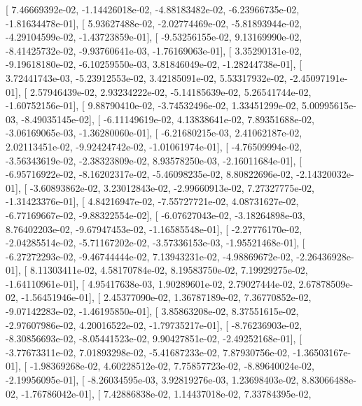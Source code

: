 \documentclass{article}
\begin{document}
       [  7.46669392e-02,  -1.14426018e-02,  -4.88183482e-02,
         -6.23966735e-02,  -1.81634478e-01],
       [  5.93627488e-02,  -2.02774469e-02,  -5.81893944e-02,
         -4.29104599e-02,  -1.43723859e-01],
       [ -9.53256155e-02,   9.13169990e-02,  -8.41425732e-02,
         -9.93760641e-03,  -1.76169063e-01],
       [  3.35290131e-02,  -9.19618180e-02,  -6.10259550e-03,
          3.81846049e-02,  -1.28244738e-01],
       [  3.72441743e-03,  -5.23912553e-02,   3.42185091e-02,
          5.53317932e-02,  -2.45097191e-01],
       [  2.57946439e-02,   2.93234222e-02,  -5.14185639e-02,
          5.26541744e-02,  -1.60752156e-01],
       [  9.88790410e-02,  -3.74532496e-02,   1.33451299e-02,
          5.00995615e-03,  -8.49035145e-02],
       [ -6.11149619e-02,   4.13838641e-02,   7.89351688e-02,
         -3.06169065e-03,  -1.36280060e-01],
       [ -6.21680215e-03,   2.41062187e-02,   2.02113451e-02,
         -9.92424742e-02,  -1.01061974e-01],
       [ -4.76509994e-02,  -3.56343619e-02,  -2.38323809e-02,
          8.93578250e-03,  -2.16011684e-01],
       [ -6.95716922e-02,  -8.16202317e-02,  -5.46098235e-02,
          8.80822696e-02,  -2.14320032e-01],
       [ -3.60893862e-02,   3.23012843e-02,  -2.99660913e-02,
          7.27327775e-02,  -1.31423376e-01],
       [  4.84216947e-02,  -7.55727721e-02,   4.08731627e-02,
         -6.77169667e-02,  -9.88322554e-02],
       [ -6.07627043e-02,  -3.18264898e-03,   8.76402203e-02,
         -9.67947453e-02,  -1.16585548e-01],
       [ -2.27776170e-02,  -2.04285514e-02,  -5.71167202e-02,
         -3.57336153e-03,  -1.95521468e-01],
       [ -6.27272293e-02,  -9.46744444e-02,   7.13943231e-02,
         -4.98869672e-02,  -2.26436928e-01],
       [  8.11303411e-02,   4.58170784e-02,   8.19583750e-02,
          7.19929275e-02,  -1.64110961e-01],
       [  4.95417638e-03,   1.90289601e-02,   2.79027444e-02,
          2.67878509e-02,  -1.56451946e-01],
       [  2.45377090e-02,   1.36787189e-02,   7.36770852e-02,
         -9.07142283e-02,  -1.46195850e-01],
       [  3.85863208e-02,   8.37551615e-02,  -2.97607986e-02,
          4.20016522e-02,  -1.79735217e-01],
       [ -8.76236903e-02,  -8.30856693e-02,  -8.05441523e-02,
          9.90427851e-02,  -2.49252168e-01],
       [ -3.77673311e-02,   7.01893298e-02,  -5.41687233e-02,
          7.87930756e-02,  -1.36503167e-01],
       [ -1.98369268e-02,   4.60228512e-02,   7.75857723e-02,
         -8.89640024e-02,  -2.19956095e-01],
       [ -8.26034595e-03,   3.92819276e-03,   1.23698403e-02,
          8.83066488e-02,  -1.76786042e-01],
       [  7.42886838e-02,   1.14437018e-02,   7.33784395e-02,
\end{document}
